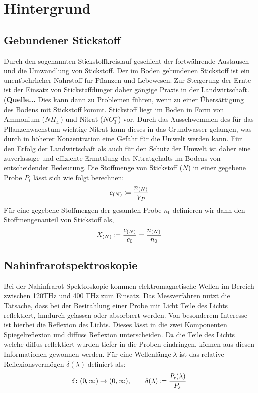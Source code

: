 \section{Hintergrund}
\label{sec:Hintergrund}
	
	\subsection{Gebundener Stickstoff}
	\label{ssec:Gebundener Stickstoff}
	
	Durch den sogenannten Stickstoffkreislauf geschieht der fortwährende  Austausch und die Umwandlung von Stickstoff.
	Der im Boden gebundenen Stickstoff ist ein unentbehrlicher Nährstoff für Pflanzen und Lebewesen.
    Zur Steigerung der Ernte ist der Einsatz von Stickstoffdünger daher gängige Praxis in der Landwirtschaft.(\textbf{Quelle...}
    Dies kann dann zu Problemen führen, wenn zu einer Übersättigung des Bodens mit Stickstoff kommt.
    Stickstoff liegt im Boden in Form von Ammonium ($NH_4^+$) und Nitrat ($NO_3^-$) vor.
    Durch das Ausschwemmen des für das Pflanzenwachstum wichtige Nitrat kann dieses in das Grundwasser gelangen, was durch in höherer Konzentration eine Gefahr für die Umwelt werden kann.
    Für den Erfolg der Landwirtschaft als auch für den Schutz der Umwelt ist daher eine zuverlässige und effiziente Ermittlung des Nitratgehalts im Bodens von entscheidender Bedeutung.
    Die Stoffmenge von Stickstoff ($N$) in einer gegebene Probe $P_i$ lässt sich wie folgt berechnen:
    	\[
			c_{(N)} \coloneqq \frac{n_{(N)}}{V_P}
		\]
    Für eine gegebene Stoffmengen der gesamten Probe $n_0$ definieren wir dann den Stoffmengenanteil von Stickstoff als,
        \[
			X_{(N)} \coloneqq \frac{c_{(N)}}{c_0} = \frac{n_{(N)}}{n_0}
		\]
   

	\subsection{Nahinfrarotspektroskopie}
	\label{ssec:nirs}
	
		Bei der Nahinfrarot Spektroskopie kommen elektromagnetische Wellen im Bereich zwischen 120THz und 400 THz zum Einsatz. \cite{Agelet2010}
		Das Messverfahren nutzt die Tatsache, dass bei der Bestrahlung einer Probe mit Licht Teile des Lichts reflektiert, hindurch gelassen oder absorbiert werden.
		Von besonderem Interesse ist hierbei die Reflexion des Lichts.
		Dieses lässt in die zwei Komponenten Spiegelreflexion und diffuse Reflexion unterscheiden.
		Da die Teile des Lichts welche diffus reflektiert wurden tiefer in die Proben eindringen, können aus diesen Informationen gewonnen werden. 
		Für eine Wellenlänge $\lambda$ ist das relative Reflexionsvermögen $\delta(\lambda)$ definiert als:
		\[
			\delta\colon(0,\infty)\to(0,\infty),\qquad \delta(\lambda) \coloneqq \frac{P_{\mathrm{r}}(\lambda)}{P_s}
		\]
		
